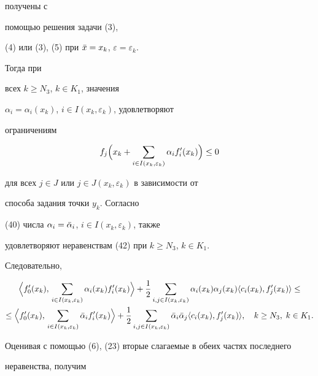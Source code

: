 \begin{pf}
получены с


помощью решения задачи (3),


(4) или (3), (5) при $\Bar x=x_k$, $\varepsilon=\varepsilon_k$.


Тогда при


всех $k\ge N_3$, $k\in K_1$, значения


$\alpha_i=\alpha_i(x_k)$, $i\in I(x_k,\varepsilon_k)$, удовлетворяют


ограничениям


\begin{equation}


f_j\Bigl(x_k+\sum_{i\in I(x_k,\varepsilon_k)}


\alpha_if'_i(x_k)\Bigr)\le 0


\end{equation}


для всех $j\in J$ или $j\in J(x_k,\varepsilon_k)$ в зависимости от


способа задания точки $y_k$. Согласно


(40) числа $\alpha_i=\Bar\alpha_i$, $i\in I(x_k,\varepsilon_k)$, также


удовлетворяют неравенствам (42) при $k\ge N_3$, $k\in K_1$.


Следовательно,


\begin{multline*}


\Bigl\la f'_0(x_k),\,\sum_{i\in I(x_k,\varepsilon_k)}\alpha_i(x_k)


f'_i(x_k)


\Bigr\ra+\frac{1}{2}\sum_{i,j\in I(x_k,\varepsilon_k)}


\alpha_i(x_k)\alpha_j(x_k)\la c_i(x_k),f'_j(x_k)\ra\le \\


\le \Bigl\la f'_0(x_k),\,\sum_{i\in I(x_k,\varepsilon_k)}


\Bar\alpha_if'_i(x_k)


\Bigr\ra+\frac{1}{2}\sum_{i,j\in I(x_k,\varepsilon_k)}


\Bar\alpha_i\Bar\alpha_j\la c_i(x_k),f'_j(x_k)\ra,


\quad k\ge N_3,\; k\in K_1.


\end{multline*}


Оценивая с помощью (6), (23) вторые слагаемые в обеих частях последнего


неравенства, получим


\begin{multline*}



\end{multline*}
\end{pf}
